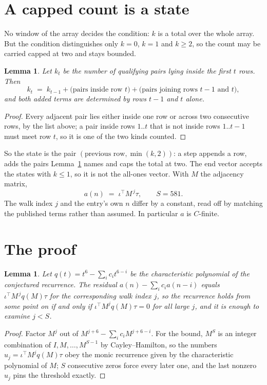 \documentclass[11pt,a4paper]{article}
\theoremstyle{plain}
\newtheorem{lemma}[theorem]{Lemma}
\theoremstyle{definition}
\begin{document}
\section{A capped count is a state}

No window of the array decides the condition: $k$ is a total over the whole array. But the
condition distinguishes only $k=0$, $k=1$ and $k\ge2$, so the count may be carried capped at
two and stays bounded.

\begin{lemma}\label{lem:cap}
Let $k_t$ be the number of qualifying pairs lying inside the first $t$ rows. Then
\[
k_{t}\;=\;k_{t-1}+\bigl(\text{pairs inside row } t\bigr)
+\bigl(\text{pairs joining rows } t-1 \text{ and } t\bigr),
\]
and both added terms are determined by rows $t-1$ and $t$ alone.
\end{lemma}

\begin{proof}
Every adjacent pair lies either inside one row or across two consecutive rows, by the list
above; a pair inside rows $1..t$ that is not inside rows $1..t-1$ must meet row $t$, so it is
one of the two kinds counted.
\end{proof}

So the state is the pair $(\text{previous row},\min(k,2))$: a step appends a row, adds the
pairs Lemma~\ref{lem:cap} names and caps the total at two. The end vector accepts the states
with $k\le1$, so it is not the all-ones vector. With $M$ the adjacency matrix,
\[
a(n)\;=\;\iota^{\!\top}M^{\,j}\tau ,\qquad S=581.
\]
The walk index $j$ and the entry's own $n$ differ by a constant, read off by matching the
published terms rather than assumed. In particular $a$ is $C$-finite.

\section{The proof}

\begin{lemma}\label{lem:crit}
Let $q(t)=t^{6}-\sum_i c_it^{6-i}$ be the characteristic polynomial of the
conjectured recurrence. The residual $a(n)-\sum_ic_ia(n-i)$ equals
$\iota^{\!\top}M^{\,j}q(M)\tau$ for the corresponding walk index $j$, so the recurrence
holds from some point on if and only if $\iota^{\!\top}M^{j}q(M)\tau=0$ for all large $j$,
and it is enough to examine $j<S$.
\end{lemma}

\begin{proof}
Factor $M^{j}$ out of $M^{j+6}-\sum_ic_iM^{j+6-i}$. For the bound, $M^{S}$
is an integer combination of $I,M,\dots,M^{S-1}$ by Cayley--Hamilton, so the numbers
$u_j=\iota^{\!\top}M^{j}q(M)\tau$ obey the monic recurrence given by the characteristic
polynomial of $M$; $S$ consecutive zeros force every later one, and the last nonzero $u_j$
pins the threshold exactly.
\end{proof}
\end{document}
